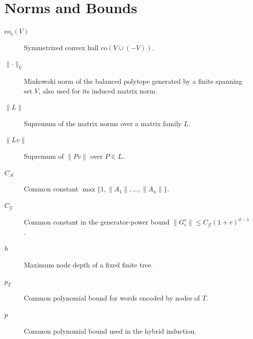 \section{Norms and Bounds}
\begin{description}
    \item[$\mathrm{co}_{\mathrm{s}}(V)$] Symmetrized convex hull $\mathrm{co}(V\cup(-V))$.
    \item[$\lVert\cdot\rVert_V$] Minkowski norm of the balanced polytope generated by a finite spanning set $V$, also used for its induced matrix norm.
    \item[$\lVert L\rVert$] Supremum of the matrix norms over a matrix family $L$.
    \item[$\lVert Lv\rVert$] Supremum of $\lVert Pv\rVert$ over $P\in L$.
    \item[$C_{\mathcal{A}}$] Common constant $\max\{1,\lVert A_1\rVert,\dots,\lVert A_n\rVert\}$.
    \item[$C_{\mathcal{G}}$] Common constant in the generator-power bound $\lVert G_i^r\rVert\leq C_{\mathcal{G}}(1+r)^{d-1}$.
    \item[$h$] Maximum node depth of a fixed finite tree.
    \item[$p_T$] Common polynomial bound for words encoded by nodes of $T$.
    \item[$p$] Common polynomial bound used in the hybrid induction.
\end{description}


